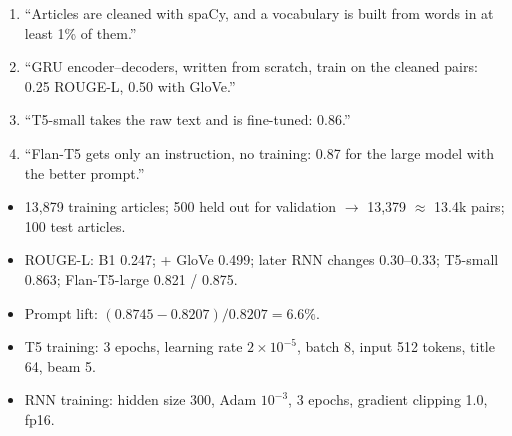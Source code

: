 \begin{sayit}
\begin{pic}
\end{pic}
\begin{enumerate}
  \item ``Articles are cleaned with spaCy, and a vocabulary is built from words in at least 1\% of them.''
  \item ``GRU encoder--decoders, written from scratch, train on the cleaned pairs: 0.25 ROUGE-L, 0.50 with GloVe.''
  \item ``T5-small takes the raw text and is fine-tuned: 0.86.''
  \item ``Flan-T5 gets only an instruction, no training: 0.87 for the large model with the better prompt.''
\end{enumerate}
\end{sayit}

\begin{sayit}
\begin{itemize}
  \item 13,879 training articles; 500 held out for validation $\to$ 13,379 $\approx$ 13.4k pairs; 100 test articles.
  \item ROUGE-L: B1 0.247; + GloVe 0.499; later RNN changes 0.30--0.33; T5-small 0.863; Flan-T5-large 0.821 / 0.875.
  \item Prompt lift: $(0.8745 - 0.8207)/0.8207 = 6.6\%$.
  \item T5 training: 3 epochs, learning rate $2\times10^{-5}$, batch 8, input 512 tokens, title 64, beam 5.
  \item RNN training: hidden size 300, Adam $10^{-3}$, 3 epochs, gradient clipping 1.0, fp16.
\end{itemize}
\end{sayit}
